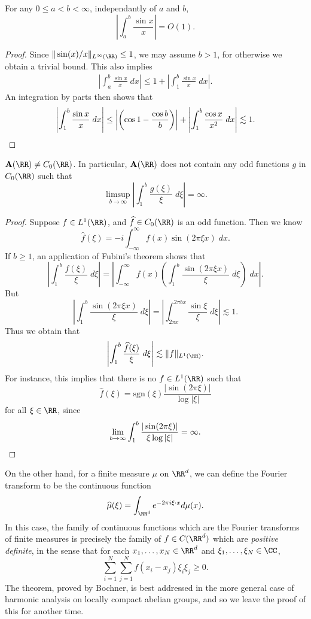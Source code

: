 \begin{lemma}
    For any $0 \leq a < b < \infty$, independantly of $a$ and $b$,
    \[ \left| \int_a^b \frac{\sin x}{x} \right| = O(1). \]
\end{lemma}
\begin{proof}
    Since $\| \sin(x)/x \|_{L^\infty(\RR)} \leq 1$, we may assume $b > 1$, for otherwise we obtain a trivial bound. This also implies
    \begin{align*}
        \left| \int_a^b \frac{\sin x}{x}\; dx \right| \leq 1 + \left| \int_1^b \frac{\sin x}{x}\; dx \right|.
    \end{align*}
    An integration by parts then shows that
    \[ \left| \int_1^b \frac{\sin x}{x}\; dx \right| \leq \left| \left( \cos 1 - \frac{\cos b}{b} \right) \right| + \left| \int_1^b \frac{\cos x}{x^2}\; dx \right| \lesssim 1. \qedhere \]
\end{proof}

\begin{theorem}
    $\mathbf{A}(\RR) \neq C_0(\RR)$. In particular, $\mathbf{A}(\RR)$ does not contain any odd functions $g$ in $C_0(\RR)$ such that
    \[ \limsup_{b \to \infty} \left| \int_1^b \frac{g(\xi)}{\xi}\; d\xi \right| = \infty. \]
\end{theorem}
\begin{proof}
    Suppose $f \in L^1(\RR)$, and $\widehat{f} \in C_0(\RR)$ is an odd function. Then we know
    \[ \widehat{f}(\xi) = -i \int_{-\infty}^\infty f(x) \sin(2 \pi \xi x)\; dx. \]
    If $b \geq 1$, an application of Fubini's theorem shows that
    \[ \left| \int_1^b \frac{\widehat{f}(\xi)}{\xi}\; d\xi \right| = \left| \int_{-\infty}^\infty f(x) \left( \int_1^b \frac{\sin(2 \pi \xi x)}{\xi}\; d\xi \right)\; dx \right|. \]
    But
    \[ \left| \int_1^b \frac{\sin(2 \pi \xi x)}{\xi}\; d\xi \right| = \left| \int_{2 \pi x}^{2 \pi b x} \frac{\sin \xi}{\xi}\; d\xi \right| \lesssim 1. \]
    Thus we obtain that
    \[ \left| \int_1^b \frac{\widehat{f}(\xi)}{\xi}\; d\xi \right| \lesssim \| f \|_{L^1(\RR)}. \]
    For instance, this implies that there is no $f \in L^1(\RR)$ such that
    \[ \widehat{f}(\xi) = \text{sgn}(\xi) \frac{|\sin(2 \pi \xi)|}{\log | \xi |} \]
    for all $\xi \in \RR$, since
    \[ \lim_{b \to \infty} \int_1^b \frac{|\sin(2 \pi \xi)|}{\xi \log |\xi|} = \infty. \qedhere \]
\end{proof}

On the other hand, for a finite measure $\mu$ on $\RR^d$, we can define the Fourier transform to be the continuous function
%
\[ \widehat{\mu}(\xi) = \int_{\RR^d} e^{-2 \pi i \xi \cdot x} d\mu(x). \]
%
In this case, the family of continuous functions which are the Fourier transforms of finite measures is precisely the family of $f \in C(\RR^d)$ which are \emph{positive definite}, in the sense that for each $x_1,\dots,x_N \in \RR^d$ and $\xi_1,\dots,\xi_N \in \CC$,
%
\[ \sum_{i = 1}^N \sum_{j = 1}^N f(x_i - x_j) \xi_i \xi_j \geq 0. \]
%
The theorem, proved by Bochner, is best addressed in the more general case of harmonic analysis on locally compact abelian groups, and so we leave the proof of this for another time.

